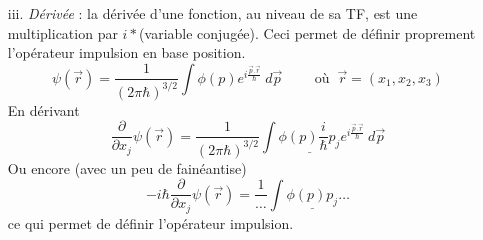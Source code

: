 \begin{itemize}
	\item[iii.] \textit{Dérivée }: la dérivée d'une fonction, au niveau de sa TF, est une multiplication 
	par $i*$(variable conjugée). Ceci permet de définir proprement l'opérateur impulsion en base 
	position.
	\begin{equation}
	\psi(\vec{r}) = \frac{1}{(2\pi\hbar)^{3/2}}\int\phi(p)e^{i\frac{\vec{p}.\vec{r}}{\hbar}}\ d\vec{p}\qquad
	\text{ où }\ \vec{r} = (x_1,x_2,x_3)
	\end{equation}
	En dérivant
	\begin{equation}
	\frac{\partial}{\partial x_j} \psi(\vec{r}) = \frac{1}{(2\pi\hbar)^{3/2}}\int\underline{\phi(p)\frac{i}
	{\hbar} p_j}	e^{i\frac{\vec{p}.\vec{r}}{\hbar}}\ d\vec{p}
	\end{equation}
	Ou encore (avec un peu de fainéantise)
	\begin{equation}
	-i\hbar\dfrac{\partial}{\partial x_j} \psi(\vec{r}) = \frac{1}{\dots}\int \underline{\phi(p)p_j}\dots
	\end{equation}
	ce qui permet de définir l'opérateur impulsion.
	
	\end{itemize}

